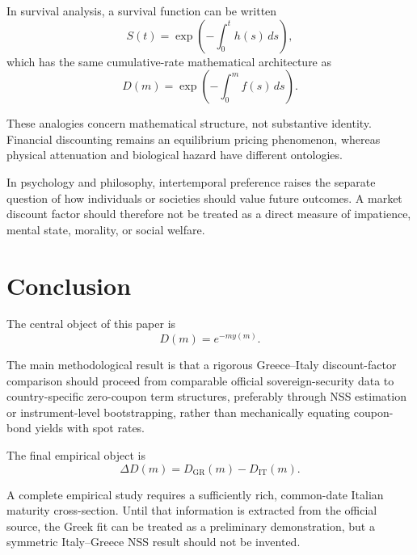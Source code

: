 \documentclass[a4paper,10pt]{article}
\theoremstyle{remark}
\begin{document}
In survival analysis, a survival function can be written
\begin{equation}
S(t)=\exp\left(-\int_0^t h(s)\,ds\right),
\end{equation}
which has the same cumulative-rate mathematical architecture as
\begin{equation}
D(m)=\exp\left(-\int_0^m f(s)\,ds\right).
\end{equation}

These analogies concern mathematical structure, not substantive identity. Financial discounting remains an equilibrium pricing phenomenon, whereas physical attenuation and biological hazard have different ontologies.

In psychology and philosophy, intertemporal preference raises the separate question of how individuals or societies should value future outcomes. A market discount factor should therefore not be treated as a direct measure of impatience, mental state, morality, or social welfare.

\section{Conclusion}

The central object of this paper is
\begin{equation}
D(m)=e^{-m y(m)}.
\end{equation}

The main methodological result is that a rigorous Greece--Italy discount-factor comparison should proceed from comparable official sovereign-security data to country-specific zero-coupon term structures, preferably through NSS estimation or instrument-level bootstrapping, rather than mechanically equating coupon-bond yields with spot rates.

The final empirical object is
\begin{equation}
\Delta D(m)=D_{\mathrm{GR}}(m)-D_{\mathrm{IT}}(m).
\end{equation}

A complete empirical study requires a sufficiently rich, common-date Italian maturity cross-section. Until that information is extracted from the official source, the Greek fit can be treated as a preliminary demonstration, but a symmetric Italy--Greece NSS result should not be invented.
\end{document}
